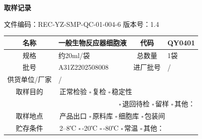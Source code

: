 \documentclass[UTF8,10pt,a4paper,fontset=fandol]{ctexart}
\renewcommand{\arraystretch}{1.15}
\newcommand{\fieldvalue}[1]{#1}
\begin{document}

\newpage

\begin{center}
{\large \textbf{取样记录}}
\end{center}

\noindent
文件编码：REC-YZ-SMP-QC-01-004-6 \qquad 版本号：1.4

\vspace{0.5em}

\renewcommand{\arraystretch}{1.8}
\begin{tabular}{|c|p{4.0cm}|c|p{3.5cm}|}
\hline
名称 &
\fieldvalue{一般生物反应器细胞液} &
代码 &
\fieldvalue{QY0401}
\\ \hline

规格 &
\fieldvalue{约20ml/袋} &
总数量 &
\fieldvalue{1袋}
\\ \hline

批号 &
\fieldvalue{A31Z2202508008} &
进厂批号 &
\fieldvalue{/}
\\ \hline

供货单位/厂家 &
\multicolumn{3}{l|}{
\fieldvalue{/}}
\\ \hline

取样目的 &
\multicolumn{3}{l|}{
\fieldvalue{\checkmark\,正常检验}
\quad $\square$\,复检
\quad $\square$\,稳定性}
\\[-1.2em]
& \multicolumn{3}{r|}{
$\square$\,退回待检
\quad $\square$\,留样
\quad $\square$\,其他：\underline{\hspace{1.5cm}}}
\\ \hline

取样地点 &
\multicolumn{3}{l|}{
\fieldvalue{\checkmark\,产品出口}
\quad $\square$\,原料库
\quad $\square$\,细胞库
\quad $\square$\,包装间}
\\ \hline

贮存条件 &
\multicolumn{3}{l|}{
\fieldvalue{\checkmark\,2--8℃}
\quad $\square$\,{-20℃}
\quad $\square$\,{-80℃}
\quad $\square$\,常温
\quad $\square$\,其他：\underline{\hspace{1.2cm}}}
\\ \hline


\end{tabular}
\end{document}
